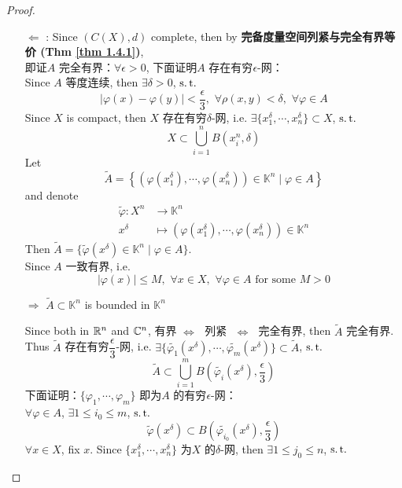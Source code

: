 \begin{thm}
\begin{proof}
\begin{enumerate}
				\item[$\Leftarrow$]: Since $(C(X) , d)$ complete, then by \textbf{完备度量空间列紧与完全有界等价 (Thm \ref{thm 1.4.1})}, \\
				即证$A$ 完全有界：$\forall \epsilon > 0$, 下面证明$A$ 存在有穷$\epsilon$-网：\\
				Since $A$ 等度连续, then $\exists \delta > 0$, $\operatorname{s.t.}$
				\[ \left| \varphi(x) - \varphi(y) \right| < \frac{\epsilon}{3} , \,\, \forall \rho(x , y) < \delta , \,\, \forall \varphi \in A \]
				Since $X$ is compact, then $X$ 存在有穷$\delta$-网, i.e. $\exists \{ x_{1}^\delta , \cdots , x_{n}^\delta \} \subset X$, $\operatorname{s.t.}$
				\[ X \subset \bigcup_{i = 1}^{n} B(x_{i}^n , \delta) \]
				Let
				\[ \widetilde{A} = \left\{ \left( \varphi(x_{1}^\delta) , \cdots , \varphi(x_{n}^\delta) \right) \in \mathbb{K}^n \mid \varphi \in A \right\} \]
				\newpage
				and denote
				\begin{align}
					\widetilde{\varphi} : X^n &\longrightarrow \mathbb{K}^n \\
					x^\delta &\longmapsto \left( \varphi(x_{1}^\delta) , \cdots , \varphi(x_{n}^\delta) \right) \in \mathbb{K}^n
				\end{align}
				Then $\widetilde{A} = \{ \widetilde{\varphi}(x^\delta) \in \mathbb{K}^n \mid \varphi \in A \}$. \\
				Since $A$ 一致有界, i.e. 
				\[ \left| \varphi(x) \right| \leq M , \,\, \forall x \in X , \,\, \forall \varphi \in A \,\, \text{for some} \,\, M > 0 \]
				\begin{center}
					$\Rightarrow \,\, \widetilde{A} \subset \mathbb{K}^n$ is bounded in $\mathbb{K}^n$
				\end{center}
				Since both in $\mathbb{R}^n$ and $\mathbb{C}^n$, 有界$\,\, \Leftrightarrow \,\,$ 列紧 $\,\, \Leftrightarrow \,\,$ 完全有界, then $\widetilde{A}$ 完全有界. \\
				Thus $\widetilde{A}$ 存在有穷$\dfrac{\epsilon}{3}$-网, i.e. $\exists \{ \widetilde{\varphi_1}(x^\delta) , \cdots , \widetilde{\varphi_m}(x^\delta) \} \subset \widetilde{A}$, $\operatorname{s.t.}$
				\[ \widetilde{A} \subset \bigcup_{i = 1}^{m} B( \widetilde{\varphi_i}(x^\delta) , \frac{\epsilon}{3}) \]
				下面证明：$\{ \varphi_1 , \cdots , \varphi_m \}$ 即为$A$ 的有穷$\epsilon$-网：\\
				$\forall \varphi \in A$, $\exists 1 \leq i_0 \leq m$, $\operatorname{s.t.}$
				\[ \widetilde{\varphi}(x^\delta) \subset B( \widetilde{\varphi_{i_0}}(x^\delta) , \frac{\epsilon}{3}) \]
				$\forall x \in X$, fix $x$. Since $\{ x_{1}^\delta , \cdots , x_{n}^\delta \}$ 为$X$ 的$\delta$-网, then $\exists 1 \leq j_0 \leq n$, $\operatorname{s.t.}$

\end{enumerate}
\end{proof}
\end{thm}
